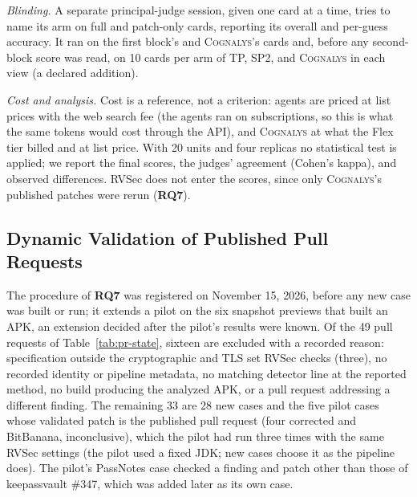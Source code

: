 \documentclass[conference]{IEEEtran}
\newcommand{\system}{\textsc{Cognalys}}
\newcommand{\researchq}[1]{\textbf{RQ#1}}
\begin{document}
\emph{Blinding.} A separate principal-judge session, given one card at a
time, tries to name its arm on full and patch-only cards, reporting its
overall and per-guess accuracy. It ran on the first block's and {\system}'s
cards and, before any second-block score was read, on 10 cards per arm of TP,
SP2, and {\system} in each view (a declared addition).

\emph{Cost and analysis.} Cost is a reference, not a criterion: agents are
priced at list prices with the web search fee (the agents ran on subscriptions,
so this is what the same tokens would cost through the API), and {\system} at what the
Flex tier billed and at list price. With 20 units and four replicas no
statistical test is applied; we report the final scores, the judges' agreement
(Cohen's kappa), and observed differences. RVSec does not enter the scores, since only
{\system}'s published patches were rerun (\researchq{7}).

\subsection{Dynamic Validation of Published Pull Requests}
\label{subsec:dynval}

The procedure of \researchq{7} was registered on November 15, 2026, before any
new case was built or run; it extends a pilot on the six snapshot previews that built an APK, an extension
decided after the pilot's results were known. Of the 49 pull requests of
Table~\ref{tab:pr-state}, sixteen are excluded with a recorded reason:
specification outside the cryptographic and TLS set RVSec checks (three), no
recorded identity or pipeline metadata, no matching detector line at the
reported method, no build producing the analyzed APK, or a pull request
addressing a different finding. The remaining 33 are 28 new cases and the five
pilot cases whose validated patch is the published pull request (four
corrected and BitBanana, inconclusive), which the pilot had run three times
with the same RVSec settings (the pilot used a fixed JDK; new cases choose it
as the pipeline does). The pilot's PassNotes case checked a finding and patch other
than those of keepassvault \#347, which was added later as its own case.
\end{document}
